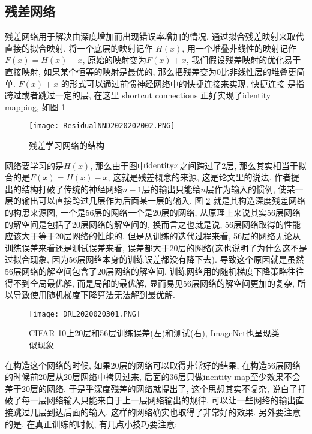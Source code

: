 \subsection{残差网络}
残差网络用于解决由深度增加而出现错误率增加的情况, 通过拟合残差映射来取代直接的拟合映射.
将一个底层的映射记作 $H(x)$, 用一个堆叠非线性的映射记作 $F(x) = H(x) - x$, 原始的映射变为$F(x) + x$, 我们假设残差映射的优化易于直接映射, 如果某个恒等的映射是最优的, 那么把残差变为0比非线性层的堆叠更简单.
$F(x) + x$ 的形式可以通过前愦神经网络中的快捷连接来实现, 快捷连接 是指跨过或者跳过一定的层, 在这里 shortcut connections 正好实现了identity mapping, 如图 \ref{ResidualNND2020202002}
\begin{figure}[H]
    \centering
    \texttt{[image: ResidualNND2020202002.PNG]}
    \caption{残差学习网络的结构}
    \label{ResidualNND2020202002}
    \vspace{-0.4cm}
\end{figure}
网络要学习的是$H(x)$, 那么由于图中$\textup{identity} x$之间跨过了2层, 那么其实相当于拟合的是$F(x)=H(x)-x$, 这就是残差概念的来源, 这是论文里的说法.
作者提出的结构打破了传统的神经网络$n-1$层的输出只能给$n$层作为输入的惯例, 使某一层的输出可以直接跨过几层作为后面某一层的输入.
图 \ref{DRL2020020301} 就是其构造深度残差网络的构思来源图, 一个是56层的网络一个是20层的网络, 从原理上来说其实56层网络的解空间是包括了20层网络的解空间的, 换而言之也就是说, 56层网络取得的性能应该大于等于20层网络的性能的.
但是从训练的迭代过程来看, 56层的网络无论从训练误差来看还是测试误差来看, 误差都大于20层的网络(这也说明了为什么这不是过拟合现象, 因为56层网络本身的训练误差都没有降下去).
导致这个原因就是虽然56层网络的解空间包含了20层网络的解空间, 训练网络用的随机梯度下降策略往往得不到全局最优解, 而是局部的最优解, 显而易见56层网络的解空间更加的复杂, 所以导致使用随机梯度下降算法无法解到最优解.
\begin{figure}[H]
    \centering
    \texttt{[image: DRL2020020301.PNG]}
    \caption{CIFAR-10上20层和56层训练误差(左)和测试(右), ImageNet也呈现类似现象}
    \label{DRL2020020301}
    \vspace{-0.4cm}
\end{figure}

在构造这个网络的时候, 如果20层的网络可以取得非常好的结果, 在构造56层网络的时候前20层从20层网络中拷贝过来, 后面的36层只做inentity map至少效果不会差于20层的网络.
于是乎深度残差的网络就提出了, 这个思想其实不复杂, 说白了打破了每一层网络输入只能来自于上一层网络输出的规律, 可以让一些网络的输出直接跳过几层到达后面的输入.
这样的网络确实也取得了非常好的效果. 另外要注意的是, 在真正训练的时候, 有几点小技巧要注意:

